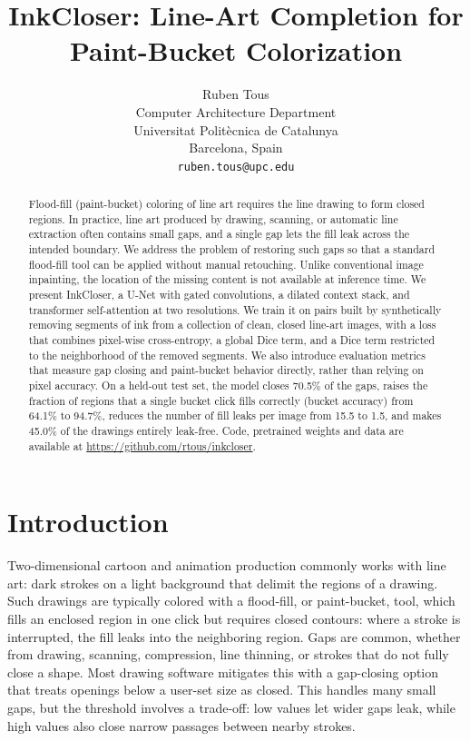 \documentclass[11pt]{article}
\title{InkCloser: Line-Art Completion for Paint-Bucket Colorization}
\author{Ruben Tous \\ Computer Architecture Department \\ Universitat Polit\`ecnica de Catalunya \\ Barcelona, Spain \\ \texttt{ruben.tous@upc.edu}}
\date{}
\begin{document}
   

\maketitle

\begin{abstract}
Flood-fill (paint-bucket) coloring of line art requires the line drawing to form closed
regions. In practice, line art produced by drawing, scanning, or automatic line extraction
often contains small gaps, and a single gap lets the fill leak across the intended
boundary. We address the problem of restoring such gaps so that a
standard flood-fill tool can be applied without manual retouching. Unlike conventional
image inpainting, the location of the missing content is not available at inference
time. We present InkCloser, a U-Net with gated convolutions, a dilated
context stack, and transformer self-attention at two resolutions. We train it on pairs
built by synthetically removing segments of ink from a collection of clean, closed line-art
images, with a loss that combines pixel-wise cross-entropy, a global Dice term, and
a Dice term restricted to the neighborhood of the removed segments.
We also introduce evaluation metrics that measure gap closing and paint-bucket
behavior directly, rather than relying on pixel accuracy. On a held-out test set, the model closes 70.5\% of the gaps, raises the fraction of
regions that a single bucket click fills correctly (bucket accuracy) from 64.1\% to 94.7\%, reduces
the number of fill leaks per image from 15.5 to 1.5, and makes 45.0\% of the drawings
entirely leak-free. Code, pretrained weights and data are available at \url{https://github.com/rtous/inkcloser}.
\end{abstract}

\section{Introduction}

Two-dimensional cartoon and animation production commonly works with line art: dark strokes on a light background that delimit the regions of a drawing. Such drawings are typically colored with a flood-fill, or paint-bucket, tool, which fills an enclosed region in one click but requires closed contours: where a stroke is interrupted, the fill leaks into the neighboring region. Gaps are common, whether from drawing, scanning, compression, line thinning, or strokes that do not fully close a shape. Most drawing software mitigates this with a gap-closing option that treats openings below a user-set size as closed. This handles many small gaps, but the threshold involves a trade-off: low values let wider gaps leak, while high values also close narrow passages between nearby strokes. 
\end{document}
